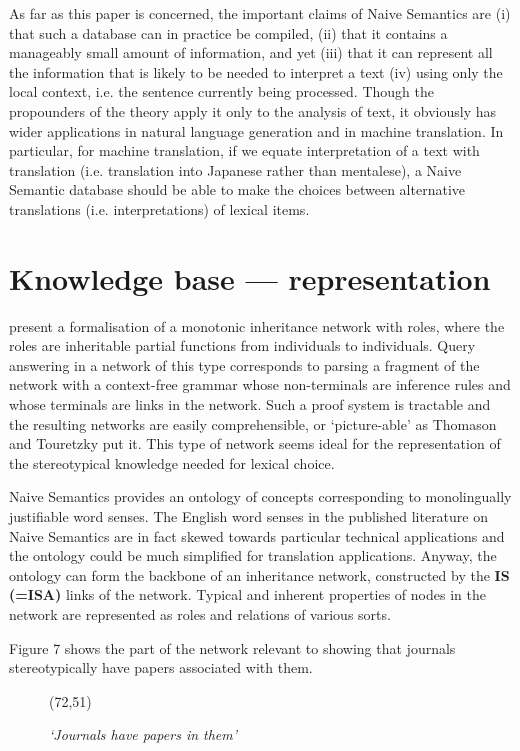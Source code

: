 As far as
this paper is concerned, the important claims of Naive Semantics are
(i) that such a database can in practice be compiled, (ii) that it
contains a manageably small amount of information, and yet (iii) that
it can represent all the information that is likely to be needed to
interpret a text (iv) using only the local context, i.e. the sentence
currently being processed.
Though the propounders of the theory apply it only to
the analysis of text, it obviously has wider applications in natural
language generation and in machine translation.
In particular, for machine translation, if we equate interpretation of a
text with translation (i.e. translation into Japanese rather than
mentalese), a Naive Semantic database should be able to make the choices
between alternative translations (i.e. interpretations) of lexical
items.


\section{Knowledge base --- representation}


\cite{thomason:92:a} present a formalisation of a monotonic
inheritance network with roles, where the roles are inheritable partial
functions from individuals to individuals.
Query answering in a network of this type corresponds to parsing a
fragment of the network with a context-free grammar whose non-terminals
are inference rules and whose terminals are links in the network.
Such a proof system is tractable and the resulting networks are easily
comprehensible, or `picture-able' as Thomason and Touretzky put it.
This type of network seems ideal for the representation of the
stereotypical knowledge needed for lexical choice.

Naive Semantics provides an ontology of concepts corresponding to
monolingually justifiable word senses.
The English word senses in the published literature on Naive Semantics
are in fact skewed towards particular technical applications and the
ontology could be much simplified for translation applications. Anyway,
the ontology can form the backbone of an inheritance network,
constructed by the
{\bf\small IS (=ISA)}
links of the network.
Typical and inherent properties of nodes in the network are represented
as roles and relations of various sorts.

Figure 7 shows the part of the network relevant to showing that journals
stereotypically have papers associated with them.

\begin{figure}[htbp]
  \begin{center}
    \leavevmode
    \atari(72,51)

    \caption{{\it `Journals have papers in them'\/}}
  \end{center}
\end{figure}

